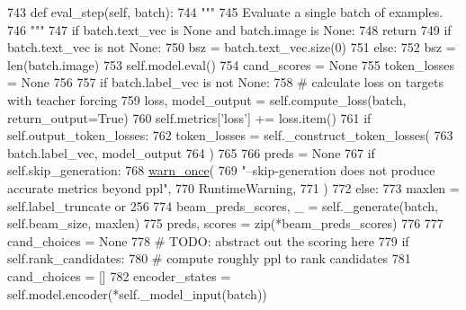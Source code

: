\begin{DoxyCode}
743     \textcolor{keyword}{def }eval\_step(self, batch):
744         \textcolor{stringliteral}{"""}
745 \textcolor{stringliteral}{        Evaluate a single batch of examples.}
746 \textcolor{stringliteral}{        """}
747         \textcolor{keywordflow}{if} batch.text\_vec \textcolor{keywordflow}{is} \textcolor{keywordtype}{None} \textcolor{keywordflow}{and} batch.image \textcolor{keywordflow}{is} \textcolor{keywordtype}{None}:
748             \textcolor{keywordflow}{return}
749         \textcolor{keywordflow}{if} batch.text\_vec \textcolor{keywordflow}{is} \textcolor{keywordflow}{not} \textcolor{keywordtype}{None}:
750             bsz = batch.text\_vec.size(0)
751         \textcolor{keywordflow}{else}:
752             bsz = len(batch.image)
753         self.model.eval()
754         cand\_scores = \textcolor{keywordtype}{None}
755         token\_losses = \textcolor{keywordtype}{None}
756 
757         \textcolor{keywordflow}{if} batch.label\_vec \textcolor{keywordflow}{is} \textcolor{keywordflow}{not} \textcolor{keywordtype}{None}:
758             \textcolor{comment}{# calculate loss on targets with teacher forcing}
759             loss, model\_output = self.compute\_loss(batch, return\_output=\textcolor{keyword}{True})
760             self.metrics[\textcolor{stringliteral}{'loss'}] += loss.item()
761             \textcolor{keywordflow}{if} self.output\_token\_losses:
762                 token\_losses = self.\_construct\_token\_losses(
763                     batch.label\_vec, model\_output
764                 )
765 
766         preds = \textcolor{keywordtype}{None}
767         \textcolor{keywordflow}{if} self.skip\_generation:
768             \hyperlink{namespaceparlai_1_1utils_1_1misc_a884a3aefa90581f53bc592fa6a78dc43}{warn\_once}(
769                 \textcolor{stringliteral}{"--skip-generation does not produce accurate metrics beyond ppl"},
770                 RuntimeWarning,
771             )
772         \textcolor{keywordflow}{else}:
773             maxlen = self.label\_truncate \textcolor{keywordflow}{or} 256
774             beam\_preds\_scores, \_ = self.\_generate(batch, self.beam\_size, maxlen)
775             preds, scores = zip(*beam\_preds\_scores)
776 
777         cand\_choices = \textcolor{keywordtype}{None}
778         \textcolor{comment}{# TODO: abstract out the scoring here}
779         \textcolor{keywordflow}{if} self.rank\_candidates:
780             \textcolor{comment}{# compute roughly ppl to rank candidates}
781             cand\_choices = []
782             encoder\_states = self.model.encoder(*self.\_model\_input(batch))

\end{DoxyCode}
